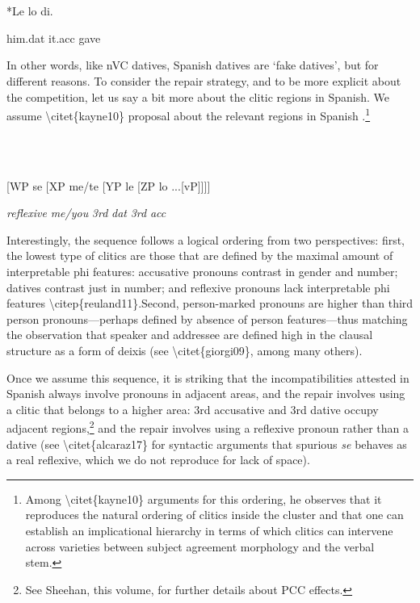 \documentclass[output=paper,modfonts,nonflat]{langsci/langscibook}
\begin{document}
\ea%
    \label{ex:key:21}
    \gll\\
        \\
    \glt
    \z

        *Le       lo       di.

    him.dat    it.acc    gave

In other words, like nVC datives, Spanish datives are ‘fake datives’, but for different reasons. To consider the repair strategy, and to be more explicit about the competition, let us say a bit more about the clitic regions in Spanish. We assume {\textbackslash}citet\{kayne10\} proposal about the relevant regions in Spanish .\footnote{Among {\textbackslash}citet\{kayne10\} arguments for this ordering, he observes that it reproduces the natural ordering of clitics inside the cluster and that one can establish an implicational hierarchy in terms of which clitics can intervene across varieties between subject agreement morphology and the verbal stem.}   

\ea%
    \label{ex:key:22}
    \gll\\
        \\
    \glt
    \z

         [WP  se  [XP  me/te  [YP  le  [ZP  lo ...[vP]]]]

    \textit{reflexive}  \textit{me/you}  \textit{3rd} \textit{dat}  \textit{3rd} \textit{acc}  

Interestingly, the sequence follows a logical ordering from two perspectives: first, the lowest type of clitics are those that are defined by the maximal amount of interpretable phi features: accusative pronouns contrast in gender and number; datives contrast just in number; and reflexive pronouns lack interpretable phi features {\textbackslash}citep\{reuland11\}.Second, person{}-marked pronouns are higher than third person pronouns—perhaps defined by absence of person features—thus matching the observation that speaker and addressee are defined high in the clausal structure as a form of deixis (see {\textbackslash}citet\{giorgi09\}, among many others). 

Once we assume this sequence, it is striking that the incompatibilities attested in Spanish always involve pronouns in adjacent areas, and the repair involves using a clitic that belongs to a higher area: 3rd accusative and 3rd dative occupy adjacent regions,\footnote{See Sheehan, this volume, for further details about PCC effects.} and the repair involves using a reflexive pronoun rather than a dative (see {\textbackslash}citet\{alcaraz17\} for syntactic arguments that spurious \textit{se} behaves as a real reflexive, which we do not reproduce for lack of space).
\end{document}
